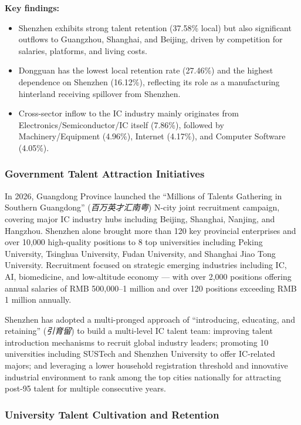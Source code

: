 \documentclass[12pt,a4paper]{article}
\begin{document}
\textbf{Key findings:}
\begin{itemize}
    \item Shenzhen exhibits strong talent retention (37.58\% local) but also
          significant outflows to Guangzhou, Shanghai, and Beijing, driven by
          competition for salaries, platforms, and living costs.
    \item Dongguan has the lowest local retention rate (27.46\%) and the
          highest dependence on Shenzhen (16.12\%), reflecting its role as a
          manufacturing hinterland receiving spillover from Shenzhen.
    \item Cross-sector inflow to the IC industry mainly originates from
          Electronics/Semiconductor/IC itself (7.86\%), followed by
          Machinery/Equipment (4.96\%), Internet (4.17\%), and Computer
          Software (4.05\%).
\end{itemize}

\subsubsection{Government Talent Attraction Initiatives}

In 2026, Guangdong Province launched the ``Millions of Talents Gathering in
Southern Guangdong'' (\textit{百万英才汇南粤}) N-city joint recruitment
campaign, covering major IC industry hubs including Beijing, Shanghai, Nanjing,
and Hangzhou. Shenzhen alone brought more than 120 key provincial enterprises
and over 10,000 high-quality positions to 8 top universities including Peking
University, Tsinghua University, Fudan University, and Shanghai Jiao Tong
University. Recruitment focused on strategic emerging industries including IC,
AI, biomedicine, and low-altitude economy — with over 2,000 positions offering
annual salaries of RMB 500,000--1 million and over 120 positions exceeding
RMB 1 million annually.

Shenzhen has adopted a multi-pronged approach of ``introducing, educating, and
retaining'' (\textit{引育留}) to build a multi-level IC talent team: improving
talent introduction mechanisms to recruit global industry leaders; promoting
10 universities including SUSTech and Shenzhen University to offer IC-related
majors; and leveraging a lower household registration threshold and innovative
industrial environment to rank among the top cities nationally for attracting
post-95 talent for multiple consecutive years.

\subsubsection{University Talent Cultivation and Retention}
\end{document}
